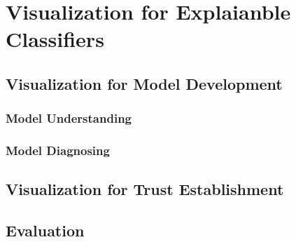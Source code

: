 \chapter{Visualization for Explaianble Classifiers}\label{sec-visualization}

\section{Visualization for Model Development}
\subsection{Model Understanding}
\subsection{Model Diagnosing}

\section{Visualization for Trust Establishment}


\section{Evaluation}

\newpage

